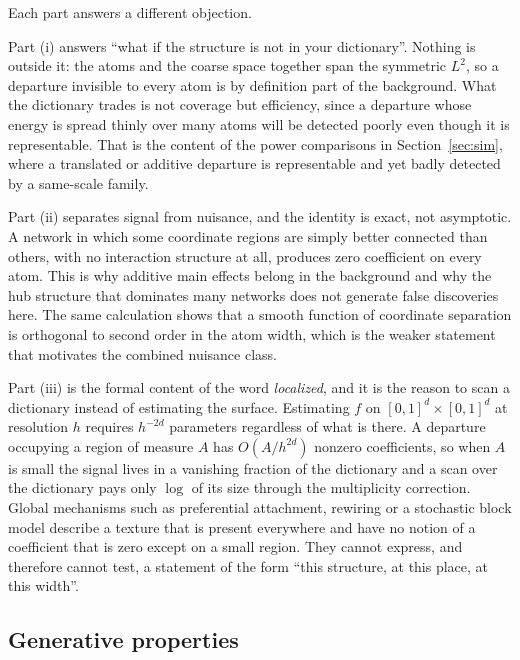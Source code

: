 \documentclass[11pt]{article}
\theoremstyle{definition}
\newcommand{\1}{\mathbf 1}\newcommand{\op}{\operatorname}
\begin{document}
Each part answers a different objection.

Part (i) answers ``what if the structure is not in your dictionary''.  Nothing
is outside it: the atoms and the coarse space together span the symmetric
$L^2$, so a departure invisible to every atom is by definition part of the
background.  What the dictionary trades is not coverage but efficiency, since a
departure whose energy is spread thinly over many atoms will be detected poorly
even though it is representable.  That is the content of the power comparisons
in Section~\ref{sec:sim}, where a translated or additive departure is
representable and yet badly detected by a same-scale family.

Part (ii) separates signal from nuisance, and the identity is exact, not
asymptotic.  A network in which some coordinate regions are simply better
connected than others, with no interaction structure at all, produces zero
coefficient on every atom.  This is why additive main effects belong in the
background and why the hub structure that dominates many networks does not
generate false discoveries here.  The same calculation shows that a smooth
function of coordinate separation is orthogonal to second order in the atom
width, which is the weaker statement that motivates the combined nuisance
class.

Part (iii) is the formal content of the word \emph{localized}, and it is the
reason to scan a dictionary instead of estimating the surface.  Estimating
$f$ on $[0,1]^d\times[0,1]^d$ at resolution $h$ requires $h^{-2d}$ parameters
regardless of what is there.  A departure occupying a region of measure $A$
has $O(A/h^{2d})$ nonzero coefficients, so when $A$ is small the signal lives
in a vanishing fraction of the dictionary and a scan over the dictionary pays
only $\log$ of its size through the multiplicity correction.  Global mechanisms
such as preferential attachment, rewiring or a stochastic block model describe
a texture that is present everywhere and have no notion of a coefficient that
is zero except on a small region.  They cannot express, and therefore cannot
test, a statement of the form ``this structure, at this place, at this width''.


\subsection{Generative properties}                        \label{app:sec-thy-gen}
\end{document}
